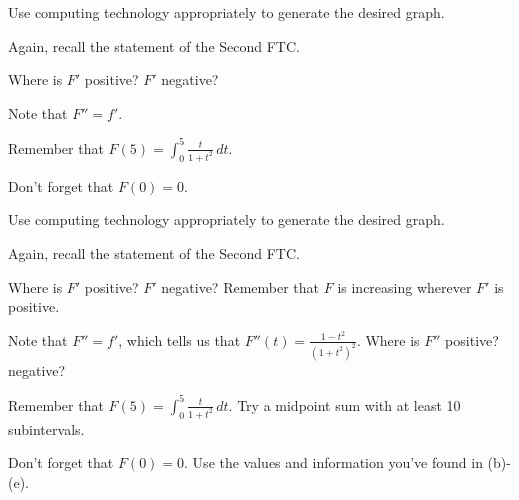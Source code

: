 \begin{smallhint}
\ba
	\item Use computing technology appropriately to generate the desired graph.
	\item Again, recall the statement of the Second FTC.
	\item Where is $F'$ positive?  $F'$ negative?
	\item Note that $F'' = f'$.
	\item Remember that $F(5) = \int_0^5 \frac{t}{1+t^2} \, dt$.
	\item Don't forget that $F(0) = 0$.
\ea
\end{smallhint}
\begin{bighint}
\ba
	\item Use computing technology appropriately to generate the desired graph.
	\item Again, recall the statement of the Second FTC.
	\item Where is $F'$ positive?  $F'$ negative?  Remember that $F$ is increasing wherever $F'$ is positive.
	\item Note that $F'' = f'$, which tells us that $F''(t) = \frac{1-t^2}{(1+t^2)^2}$.  Where is $F''$ positive? negative?
	\item Remember that $F(5) = \int_0^5 \frac{t}{1+t^2} \, dt$.  Try a midpoint sum with at least 10 subintervals.
	\item Don't forget that $F(0) = 0$.  Use the values and information you've found in (b)-(e).
\ea
\end{bighint}
